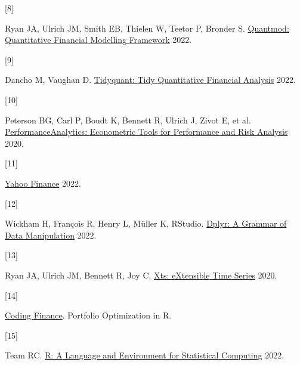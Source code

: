 \documentclass[
]{article}
\newlength{\cslhangindent}
\newlength{\csllabelwidth}
\newlength{\cslentryspacingunit} %
\newenvironment{CSLReferences}[2] %
 {%
  \setlength{\parindent}{0pt}
  \ifodd #1
  \let\oldpar\par
  \def\par{\hangindent=\cslhangindent\oldpar}
  \fi
  \setlength{\parskip}{#2\cslentryspacingunit}
 }%
 {}
\newcommand{\CSLLeftMargin}[1]{\parbox[t]{\csllabelwidth}{#1}}
\newcommand{\CSLRightInline}[1]{\parbox[t]{\linewidth - \csllabelwidth}{#1}\break}
\begin{document}
\begin{CSLReferences}{0}{0}
\leavevmode{}%
\CSLLeftMargin{{[}8{]} }%
\CSLRightInline{Ryan JA, Ulrich JM, Smith EB, Thielen W, Teetor P,
Bronder S. \href{https://CRAN.R-project.org/package=quantmod}{Quantmod:
{Quantitative} {Financial} {Modelling} {Framework}} 2022.}

\leavevmode{}%
\CSLLeftMargin{{[}9{]} }%
\CSLRightInline{Dancho M, Vaughan D.
\href{https://CRAN.R-project.org/package=tidyquant}{Tidyquant: {Tidy}
{Quantitative} {Financial} {Analysis}} 2022.}

\leavevmode{}%
\CSLLeftMargin{{[}10{]} }%
\CSLRightInline{Peterson BG, Carl P, Boudt K, Bennett R, Ulrich J, Zivot
E, et al.
\href{https://CRAN.R-project.org/package=PerformanceAnalytics}{{PerformanceAnalytics}:
{Econometric} {Tools} for {Performance} and {Risk} {Analysis}} 2020.}

\leavevmode{}%
\CSLLeftMargin{{[}11{]} }%
\CSLRightInline{\href{https://finance.yahoo.com/}{Yahoo {Finance}}
2022.}

\leavevmode{}%
\CSLLeftMargin{{[}12{]} }%
\CSLRightInline{Wickham H, François R, Henry L, Müller K, RStudio.
\href{https://CRAN.R-project.org/package=dplyr}{Dplyr: {A} {Grammar} of
{Data} {Manipulation}} 2022.}

\leavevmode{}%
\CSLLeftMargin{{[}13{]} }%
\CSLRightInline{Ryan JA, Ulrich JM, Bennett R, Joy C.
\href{https://CRAN.R-project.org/package=xts}{Xts: {eXtensible} {Time}
{Series}} 2020.}

\leavevmode{}%
\CSLLeftMargin{{[}14{]} }%
\CSLRightInline{\href{https://www.codingfinance.com/post/2018-05-31-portfolio-opt-in-r/}{Coding
{Finance}}. Portfolio Optimization in R.}

\leavevmode{}%
\CSLLeftMargin{{[}15{]} }%
\CSLRightInline{Team RC. \href{https://www.r-project.org/}{R: {A}
{Language} and {Environment} for {Statistical} {Computing}} 2022.}

\end{CSLReferences}
\end{document}
